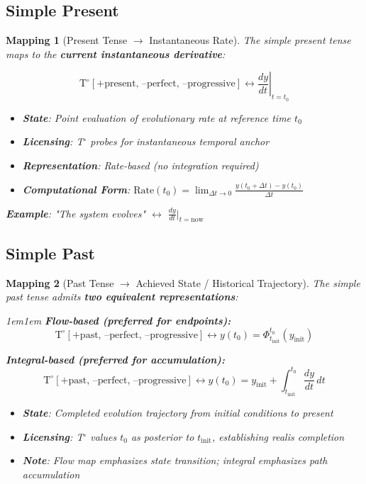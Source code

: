 \documentclass[11pt]{article}
\theoremstyle{defstyle}
\theoremstyle{mapstyle}
\newtheorem{mapping}{Mapping}[section]
\begin{document}
\subsection{Simple Present}

\begin{mapping}[Present Tense $\to$ Instantaneous Rate]
The simple present tense maps to the \textbf{current instantaneous derivative}:

\[
\boxed{\mathrm{T}^\circ[\text{+present, --perfect, --progressive}] \longleftrightarrow \left.\frac{dy}{dt}\right|_{t=t_0}}
\]

\begin{itemize}
\item \textbf{State}: Point evaluation of evolutionary rate at reference time $t_0$
\item \textbf{Licensing}: T$^\circ$ probes for instantaneous temporal anchor
\item \textbf{Representation}: Rate-based (no integration required)
\item \textbf{Computational Form}: $\text{Rate}(t_0) = \lim_{\Delta t \to 0} \frac{y(t_0+\Delta t) - y(t_0)}{\Delta t}$
\end{itemize}

\textbf{Example}: "The system evolves" $\leftrightarrow$ $\frac{dy}{dt}\big|_{t=\text{now}}$
\end{mapping}

\subsection{Simple Past}

\begin{mapping}[Past Tense $\to$ Achieved State / Historical Trajectory]
The simple past tense admits \textbf{two equivalent representations}:

\begin{adjustwidth}{1em}{1em}
\noindent\textbf{Flow-based (preferred for endpoints):}
\[
\boxed{\mathrm{T}^\circ[\text{+past, --perfect, --progressive}] \longleftrightarrow y(t_0) = \Phi_{t_{\mathrm{init}}}^{t_0}(y_{\mathrm{init}})}
\]

\noindent\textbf{Integral-based (preferred for accumulation):}
\[
\boxed{\mathrm{T}^\circ[\text{+past, --perfect, --progressive}] \longleftrightarrow y(t_0) = y_{\mathrm{init}} + \int_{t_{\mathrm{init}}}^{t_0} \frac{dy}{dt}\,dt}
\]
\end{adjustwidth}

\begin{itemize}
\item \textbf{State}: Completed evolution trajectory from initial conditions to present
\item \textbf{Licensing}: T$^\circ$ values $t_0$ as posterior to $t_{\mathrm{init}}$, establishing realis completion
\item \textbf{Note}: Flow map emphasizes state transition; integral emphasizes path accumulation
\end{itemize}
\end{mapping}
\end{document}
